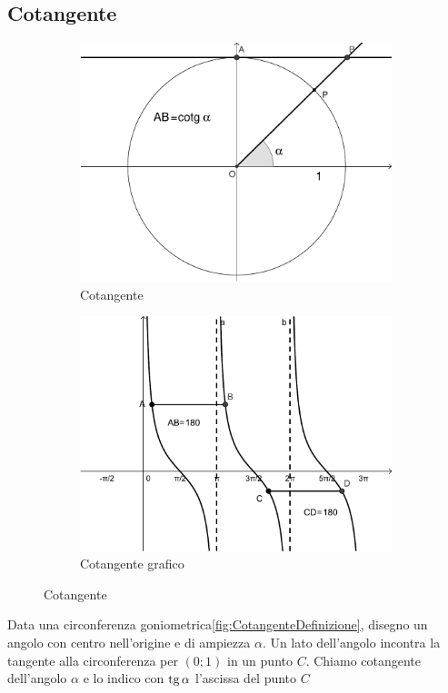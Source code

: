 \subsection{Cotangente}
\label{sec:Cotangente}
\begin{figure}
	\begin{subfigure}[b]{.5\linewidth}
		\centering\includegraphics[scale=0.3]{cotgalpha-crop}
		\caption{Cotangente}\label{fig:CotangenteDefinizione}
	\end{subfigure}%
	\begin{subfigure}[b]{.5\linewidth}
		\centering\includegraphics[scale=0.3]{cotgalphagrafico-crop}
		\caption{Cotangente grafico}\label{fig:CotangenteGrafico}
	\end{subfigure}
	\caption{Cotangente}
	\label{tab:funzcotg}
\end{figure}
\begin{definizione}[Cotangente]
	Data una circonferenza goniometrica\nobs\vref{fig:CotangenteDefinizione}, disegno un angolo con centro nell'origine e di ampiezza $\alpha$. Un lato dell'angolo incontra la tangente  alla circonferenza  per $(0;1)$ in un punto $C$.  Chiamo cotangente dell'angolo $\alpha$ e lo indico con $\operatorname{tg}\alpha$ l'ascissa  del punto $C$
\end{definizione}
